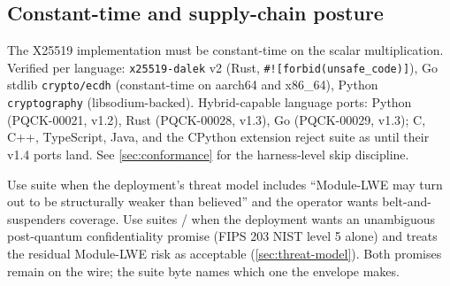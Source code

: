 \subsection{Constant-time and supply-chain posture}

The X25519 implementation must be constant-time on the scalar multiplication. Verified per language: \texttt{x25519-dalek} v2 (Rust, \texttt{\#![forbid(unsafe\_code)]}), Go stdlib \texttt{crypto/ecdh} (constant-time on aarch64 and x86\_64), Python \texttt{cryptography} (libsodium-backed). Hybrid-capable language ports: Python (PQCK-00021, v1.2), Rust (PQCK-00028, v1.3), Go (PQCK-00029, v1.3); C, C++, TypeScript, Java, and the CPython extension reject suite  as  until their v1.4 ports land. See \cref{sec:conformance} for the harness-level skip discipline.

\begin{calloutinfo}
Use suite  when the deployment's threat model includes ``Module-LWE may turn out to be structurally weaker than believed'' and the operator wants belt-and-suspenders coverage. Use suites / when the deployment wants an unambiguous post-quantum confidentiality promise (FIPS 203 NIST level 5 alone) and treats the residual Module-LWE risk as acceptable (\cref{sec:threat-model}). Both promises remain on the wire; the suite byte names which one the envelope makes.
\end{calloutinfo}
